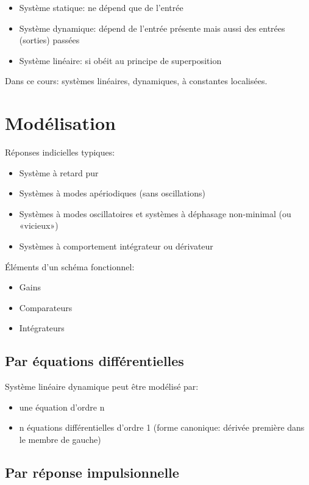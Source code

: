 \documentclass[10pt, twocolumn]{article}
\begin{document}
			\begin{itemize}
				\item Système statique: ne dépend que de l'entrée
				\item Système dynamique: dépend de l'entrée présente mais aussi des entrées (sorties) passées
				\item Système linéaire: si obéit au principe de superposition
			\end{itemize}
			
			Dans ce cours: systèmes linéaires, dynamiques, à constantes localisées.
	
	\section*{Modélisation}
		
		Réponses indicielles typiques:
		
		\begin{itemize}
			\item Système à retard pur
			\item Systèmes à modes apériodiques (sans oscillations)
			\item Systèmes à modes oscillatoires et systèmes à déphasage non-minimal (ou «vicieux»)
			\item Systèmes à comportement intégrateur ou dérivateur
		\end{itemize}
		
		Éléments d'un schéma fonctionnel:
		
		\begin{itemize}
			\item Gains
			\item Comparateurs
			\item Intégrateurs
		\end{itemize}
		
		\subsection*{Par équations différentielles}
			Système linéaire dynamique peut être modélisé par:
			
				\begin{itemize}
					\item une équation d'ordre n
					\item n équations différentielles d'ordre 1 (forme canonique: dérivée première dans le membre de gauche)
				\end{itemize}
		
		\subsection*{Par réponse impulsionnelle}
		
\end{document}
